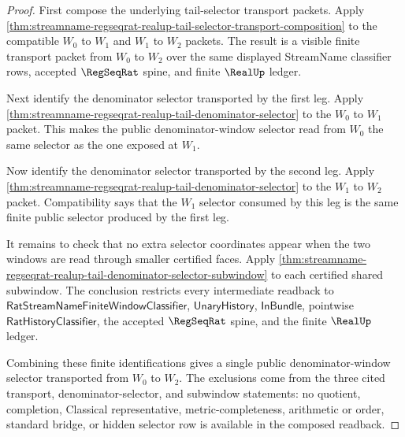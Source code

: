 \begin{proof}
First compose the underlying tail-selector transport packets. Apply
\autoref{thm:streamname-regseqrat-realup-tail-selector-transport-composition}
to the compatible $W_0$ to $W_1$ and $W_1$ to $W_2$ packets. The result is a
visible finite transport packet from $W_0$ to $W_2$ over the same displayed
StreamName classifier rows, accepted $\RegSeqRat$ spine, and finite $\RealUp$
ledger.

Next identify the denominator selector transported by the first leg. Apply
\autoref{thm:streamname-regseqrat-realup-tail-denominator-selector} to the
$W_0$ to $W_1$ packet. This makes the public denominator-window selector read
from $W_0$ the same selector as the one exposed at $W_1$.

Now identify the denominator selector transported by the second leg. Apply
\autoref{thm:streamname-regseqrat-realup-tail-denominator-selector} to the
$W_1$ to $W_2$ packet. Compatibility says that the $W_1$ selector consumed by
this leg is the same finite public selector produced by the first leg.

It remains to check that no extra selector coordinates appear when the two
windows are read through smaller certified faces. Apply
\autoref{thm:streamname-regseqrat-realup-tail-denominator-selector-subwindow}
to each certified shared subwindow. The conclusion restricts every intermediate
readback to $\mathsf{RatStreamNameFiniteWindowClassifier}$,
$\mathsf{UnaryHistory}$, $\mathsf{InBundle}$, pointwise
$\mathsf{RatHistoryClassifier}$, the accepted $\RegSeqRat$ spine, and the
finite $\RealUp$ ledger.

Combining these finite identifications gives a single public
denominator-window selector transported from $W_0$ to $W_2$. The exclusions
come from the three cited transport, denominator-selector, and subwindow
statements: no quotient, completion, Classical representative,
metric-completeness, arithmetic or order, standard bridge, or hidden selector
row is available in the composed readback.
\end{proof}

